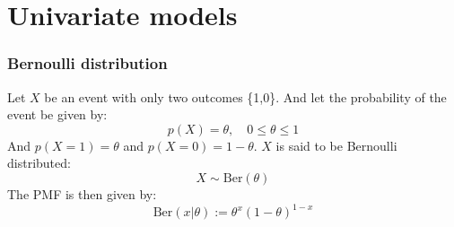 \documentclass[usenames,dvipsnames,smaller%
]{beamer}
\newcommand{\?}{\stackrel{?}{=}}
\begin{document}

\section{Univariate models}

\begin{frame}
  \frametitle{Bernoulli distribution}
  \pause
  Let $X$ be an event with only two outcomes \{1,0\}. \pause And let the probability of the event be given by:
  \pause
  \begin{equation*}
    p(X) = \theta, \quad 0\le\theta \le1
  \end{equation*}
  \pause
  And $p(X=1) = \theta$ and $p(X=0) = 1-\theta$.
  \pause
  $X$ is said to be Bernoulli distributed:
  \pause
  \begin{equation}
    X \sim \mathrm{Ber}(\theta)
  \end{equation}
  \pause
  The PMF is then given by: \pause
  \begin{equation}
  \mathrm{Ber}(x| \theta) := \theta^x(1 - \theta)^{1-x}
\end{equation}
\end{frame}
\end{document}

